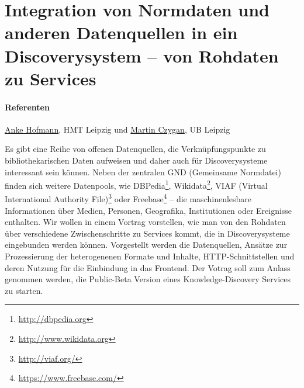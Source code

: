 \documentclass[german]{article}
\begin{document}
\thispagestyle{empty}
\section*{Integration von Normdaten und anderen Datenquellen in ein Discoverysystem -- von Rohdaten zu Services}

\paragraph{Referenten}  \href{mailto:anke.hofmann@hmt-leipzig.de}{Anke Hofmann}, HMT Leipzig und \href{mailto:martin.czygan@uni-leipzig.de}{Martin Czygan}, UB Leipzig\\
\vspace{0.2cm}

Es gibt eine Reihe von offenen Datenquellen,
die Verknüpfungspunkte zu bibliothekarischen Daten aufweisen und daher
auch für Discoverysysteme interessant sein können. Neben der
zentralen GND (Gemeinsame Normdatei) finden sich weitere Datenpools,
wie DBPedia\footnote{\url{http://dbpedia.org}}, Wikidata\footnote{\url{http://www.wikidata.org}},
VIAF (Virtual International Authority File)\footnote{\url{http://viaf.org/}}
oder Freebase\footnote{\url{https://www.freebase.com/}} -- die maschinenlesbare
Informationen über Medien, Personen, Geografika, Institutionen oder Ereignisse
enthalten. Wir wollen in einem Vortrag vorstellen, wie man von den
Rohdaten über verschiedene Zwischenschritte zu Services kommt, die in
Discoverysysteme eingebunden werden können. Vorgestellt werden die Datenquellen,
Ansätze zur Prozessierung der heterogenenen Formate und Inhalte,
HTTP-Schnittstellen und deren Nutzung für die Einbindung in das Frontend.
Der Votrag soll zum Anlass genommen werden, die Public-Beta Version
eines Knowledge-Discovery Services zu starten.
\end{document}
